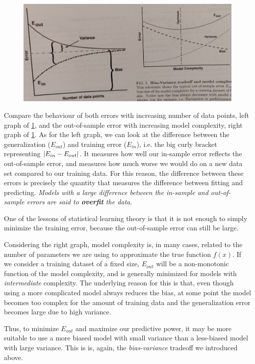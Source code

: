 \begin{figure}[h!]
	\centering
	\includegraphics[width=0.7\linewidth]{gfx/InOutError.png}
	\caption{}
	\label{fig:errorbehaviour}
\end{figure}
Compare the behaviour of both errors with increasing number of data points, left graph of \ref{fig:errorbehaviour}, and the out-of-sample error with increasing model complexity, right graph of \ref{fig:errorbehaviour}. As for the left graph, we can look at the difference between the generalization ($E_{out}$) and training error ($E_{in}$), i.e. the big curly bracket representing $\abs{E_{in}-E_{out}}$. It measures how well our in-sample error reflects the out-of-sample error, and measures how much worse we would do on a new data set compared to our training data. For this reason, the difference between these errors is precisely the quantity that measures the difference between fitting and predicting. \emph{Models with a large difference between the in-sample and out-of-sample errors are said to \textbf{overfit} the data}. 
\begin{mybox}{}
	One of the lessons of statistical learning theory is that it is not enough to simply minimize the training error, because the out-of-sample error can still be large.
\end{mybox}
Considering the right graph, model  complexity is, in many cases, related to the number of parameters we are using to approximate the true function $f(x)$. If we consider a training dataset of a fixed size, $E_{out}$ will be a non-monotonic function of the model complexity, and is generally minimized for models with \emph{intermediate} complexity. The underlying reason for this is that, even though using a more complicated model always reduces the bias, at some point the model becomes too complex for the amount of training data and the generalization error becomes large due to high variance.
\begin{mybox}{}
Thus, to minimize $E_{out}$ and maximize our predictive power, it may be more suitable to use a more biased model with small variance than a less-biased model with large variance. This is is, again, the \emph{bias-variance} tradeoff we introduced above.
\end{mybox} 
